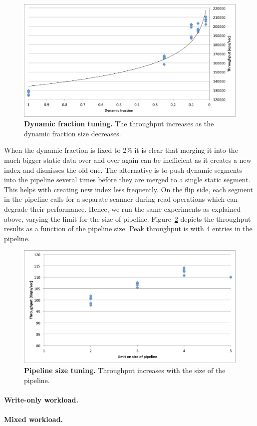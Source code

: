 \begin{figure}[htb]
\includegraphics[width=\figw]{Figs/dynamic-fraction.png}
\caption{{\bf Dynamic fraction tuning.} The throughput increases as the dynamic fraction size decreases.
}
\label{fig:dynamic-fraction}
\end{figure}

When the dynamic fraction is fixed to 2\% it is clear that merging it into the much bigger static data over and over again can be inefficient as it creates a new index and dismisses the old one. 
The alternative is to push dynamic segments into the pipeline  several times before they are merged to a single static segment. This helps with creating new index less frequently.
On the flip side, each segment in the pipeline calls for a separate scanner during read operations which can degrade their performance.
Hence, we run the same experiments as explained above, varying the limit for the size of pipeline.
Figure~\ref{fig:pipeline} depicts the throughput results as a function of the pipeline size. Peak throughput is with 4 entries in the pipeline.

\begin{figure}[htb]
\includegraphics[width=\figw]{Figs/pipeline.png}
\caption{{\bf Pipeline size tuning.} Throughput increases with the size of the pipeline.
}
\label{fig:pipeline}
\end{figure}

\paragraph{Write-only workload.}

\paragraph{Mixed workload.}

